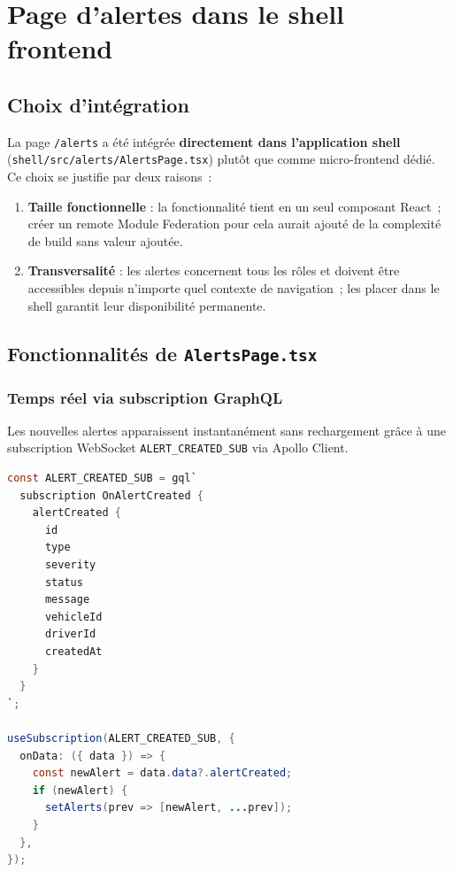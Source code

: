 \documentclass[12pt,a4paper]{article}
\begin{document}
\section{Page d'alertes dans le shell frontend}

\subsection{Choix d'int\'{e}gration}

La page \texttt{/alerts} a \'{e}t\'{e} int\'{e}gr\'{e}e \textbf{directement dans l'application
shell} (\texttt{shell/src/alerts/AlertsPage.tsx}) plut\^{o}t que
comme micro-frontend d\'{e}di\'{e}. Ce choix se justifie par deux raisons~:

\begin{enumerate}[leftmargin=*]
  \item \textbf{Taille fonctionnelle} : la fonctionnalit\'{e} tient en un seul
        composant React~; cr\'{e}er un remote Module Federation pour cela aurait
        ajout\'{e} de la complexit\'{e} de build sans valeur ajout\'{e}e.
  \item \textbf{Transversalit\'{e}} : les alertes concernent tous les r\^{o}les et
        doivent \^{e}tre accessibles depuis n'importe quel contexte de navigation~;
        les placer dans le shell garantit leur disponibilit\'{e} permanente.
\end{enumerate}

\subsection{Fonctionnalit\'{e}s de \texttt{AlertsPage.tsx}}

\subsubsection{Temps r\'{e}el via subscription GraphQL}

Les nouvelles alertes apparaissent instantan\'{e}ment sans rechargement gr\^{a}ce
\`{a} une subscription WebSocket \texttt{ALERT\_CREATED\_SUB} via Apollo Client.

\begin{lstlisting}[language=Java, caption=Subscription temps r\'{e}el des alertes
--- \texttt{AlertsPage.tsx}]
const ALERT_CREATED_SUB = gql`
  subscription OnAlertCreated {
    alertCreated {
      id
      type
      severity
      status
      message
      vehicleId
      driverId
      createdAt
    }
  }
`;

useSubscription(ALERT_CREATED_SUB, {
  onData: ({ data }) => {
    const newAlert = data.data?.alertCreated;
    if (newAlert) {
      setAlerts(prev => [newAlert, ...prev]);
    }
  },
});
\end{lstlisting}
\end{document}
